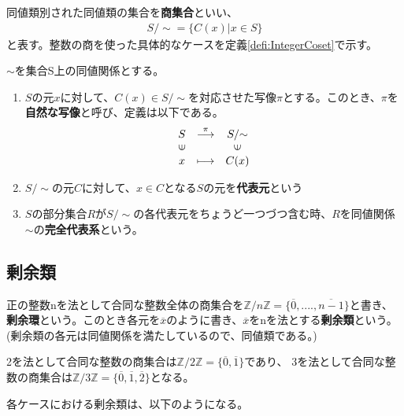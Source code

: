 \documentclass[dvipdfmx,autodetect-engine]{jsarticle}
\begin{document}
同値類別された同値類の集合を{\bf 商集合}といい、
\begin{eqnarray*}
S/{\sim}  = \{C(x)| x ∈ S\}
\end{eqnarray*}
と表す。整数の商を使った具体的なケースを定義\ref{defi:IntegerCoset}で示す。

 $\sim$を集合S上の同値関係とする。
\begin{enumerate}
\renewcommand{\labelenumi}{(\arabic{enumi})}
\item $S$の元$x$に対して、$C(x) \in S/{\sim}$を対応させた写像$\pi$とする。このとき、$\pi$を{\bf 自然な写像}と呼び、定義は以下である。
$$
\begin{array}{ccc}
S & \stackrel{\pi}{\longrightarrow} & S/{\sim} \\
\rotatebox{90}{$\in$} & & \rotatebox{90}{$\in$} \\
x & \longmapsto & C(x)
\end{array}
$$

\item $S/{\sim}$の元$C$に対して、$x \in C$となる$S$の元を{\bf 代表元}という

\item $S$の部分集合$R$が$S/{\sim}$の各代表元をちょうど一つづつ含む時、$R$を同値関係$\sim$の{\bf 完全代表系}という。

\end{enumerate}

\subsection{剰余類}

\label{defi:IntegerCoset}

正の整数nを法として合同な整数全体の商集合を$\mathbb{Z}/n\mathbb{Z} = \{\overline{0}, ...., \overline{n - 1}\}$と書き、{\bf 剰余環}という。このとき各元を$\overline{x}$のように書き、$\overline{x}$をnを法とする{\bf 剰余類}という。(剰余類の各元は同値関係を満たしているので、同値類である。)

\exam 2を法として合同な整数の商集合は$\mathbb{Z}/2\mathbb{Z} = \{\overline{0}, \overline{1}\}$であり、
3を法として合同な整数の商集合は$\mathbb{Z}/3\mathbb{Z} = \{\overline{0}, \overline{1}, \overline{2}\}$となる。

各ケースにおける剰余類は、以下のようになる。
\end{document}
